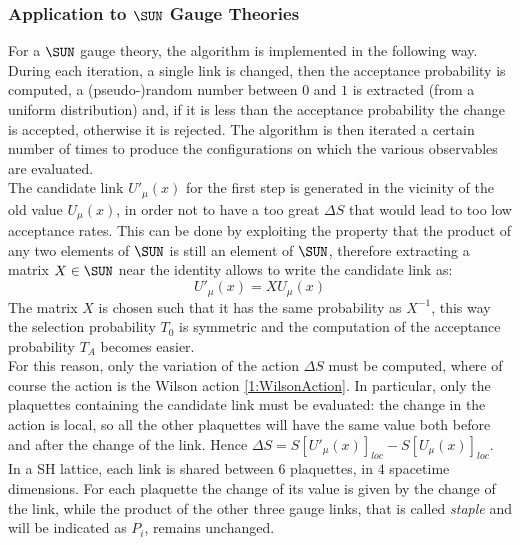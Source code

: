 \subsubsection{Application to $\SUN$ Gauge Theories}
For a $\SUN$ gauge theory, the algorithm is implemented in the following way.
During each iteration, a single link is changed, then the acceptance probability is computed, a (pseudo-)random number between $0$ and $1$ is extracted (from a uniform distribution) and, if it is less than the acceptance probability the change is accepted, otherwise it is rejected.
The algorithm is then iterated a certain number of times to produce the configurations on which the various observables are evaluated.\\
The candidate link $U'_\mu(x)$ for the first step is generated in the vicinity of the old value $U_\mu(x)$, in order not to have a too great $\Delta S$ that would lead to too low acceptance rates.
This can be done by exploiting the property that the product of any two elements of $\SUN$ is still an element of $\SUN$, therefore extracting a matrix $X\in\SUN$ near the identity allows to write the candidate link as:
\begin{equation}
    U'_\mu(x) = XU_\mu(x) \label{2:MetropolisCandidateLink}
\end{equation}
The matrix $X$ is chosen such that it has the same probability as $X^{-1}$, this way the selection probability $T_0$ is symmetric and the computation of the acceptance probability $T_A$ becomes easier.\\
For this reason, only the variation of the action $\Delta S$ must be computed, where of course the action is the Wilson action \eqref{1:WilsonAction}.
In particular, only the plaquettes containing the candidate link must be evaluated: the change in the action is local, so all the other plaquettes will have the same value both before and after the change of the link.
Hence $\Delta S = S[U'_\mu(x)]_{loc}-S[U_\mu(x)]_{loc}$.\\
In a SH lattice, each link is shared between $6$ plaquettes, in $4$ spacetime dimensions.
For each plaquette the change of its value is given by the change of the link, while the product of the other three gauge links, that is called \emph{staple} and will be indicated as $P_i$, remains unchanged.\\
